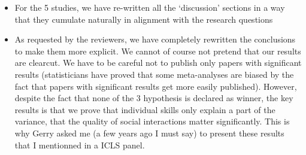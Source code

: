 \documentclass{article}
\begin{document}
\begin{itemize}
    \item For the 5 studies, we have re-written all the ‘discussion’ sections in a
        way that they cumulate naturally in alignment with the research questions

    \item As requested by the reviewers, we have completely rewritten  the
        conclusions to make them more explicit.  We cannot of course not pretend
        that our results are clearcut. We have to be careful not to publish only
        papers with significant results (statisticians have proved that some
        meta-analyses are biased by the fact that papers with significant results
        get more easily published). However, despite the fact that none of the 3
        hypothesis is declared as winner, the key results is that we prove that
        individual skills only explain a part of the variance, that the quality of
        social interactions matter significantly. This is why Gerry asked me (a
        few years ago I must say) to present these results that I mentionned in a
        ICLS panel.

\end{itemize}
\end{document}
